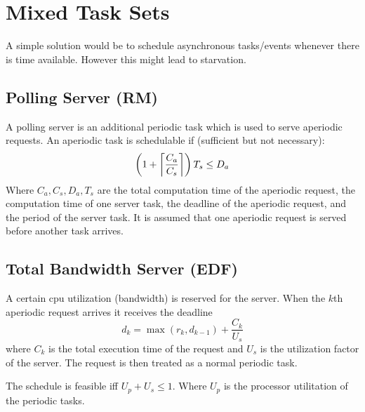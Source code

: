 \section{Mixed Task Sets}
A simple solution would be to schedule asynchronous tasks/events whenever there
is time available. However this might lead to starvation.

\subsection{Polling Server (RM)}
A polling server is an additional periodic task which is used to serve aperiodic
requests. An aperiodic task is schedulable if (sufficient but not necessary):
\begin{equation*}
	\left(1 + \left\lceil \frac{C_a}{C_s} \right\rceil\right)T_s \leq D_a
\end{equation*}
Where $C_a, C_s, D_a, T_s$ are the total computation time of the aperiodic
request, the computation time of one server task, the deadline of the aperiodic
request, and the period of the server task. It is assumed that one aperiodic
request is served before another task arrives.

\subsection{Total Bandwidth Server (EDF)}
A certain cpu utilization (bandwidth) is reserved for the server.  When the
$k$th aperiodic request arrives it receives the deadline
\begin{equation*}
	d_k = \max\left( r_k, d_{k-1} \right) + \frac{C_k}{U_s}
\end{equation*}
where $C_k$ is the total execution time of the request and $U_s$ is the
utilization factor of the server. The request is then treated as a normal
periodic task.

The schedule is feasible iff $U_p + U_s \leq 1$. Where $U_p$ is the processor
utilitation of the periodic tasks.
